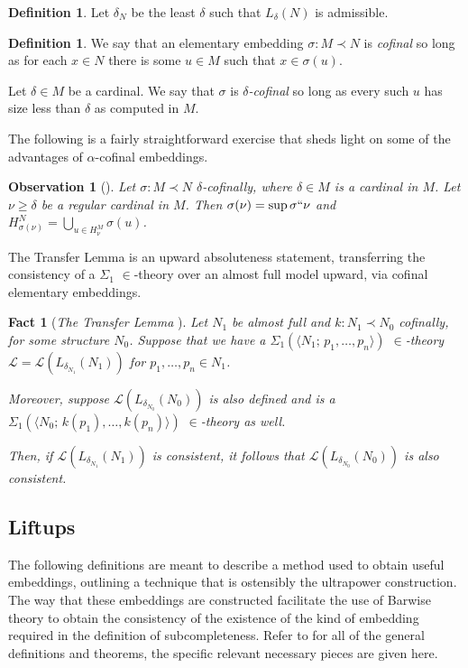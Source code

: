 \documentclass{amsart}
\newtheorem{observation}[theorem]{Observation}
\newtheorem{fact}[theorem]{Fact}
\theoremstyle{definition}
\newtheorem{definition}[theorem]{Definition}
\theoremstyle{remark}
\begin{document}
\begin{definition} Let $\delta_N$ be the least $\delta$ such that $L_\delta(N)$ is admissible. \end{definition}

\begin{definition} We say that an elementary embedding $\sigma: M \prec N$ is \emph{cofinal} so long as for each $x \in N$ there is some $u \in M$ such that $x \in \sigma(u)$. 

Let $\delta \in M$ be a cardinal. We say that $\sigma$ is \emph{$\delta$-cofinal} so long as every such $u$ has size less than $\delta$ as computed in $M$. \end{definition}

The following is a fairly straightforward exercise that sheds light on some of the advantages of $\alpha$-cofinal embeddings.

\begin{observation}[{\cite[Cor. 3.7]{Jensen:2014}}] \label{observation:regularitySups}
Let $\sigma:M \prec N$ $\delta$-cofinally, where $\delta \in M$ is a cardinal in $M$. Let $\nu \geq \delta$ be a regular cardinal in $M$. Then $\sigma(\nu)=\sup \sigma``\nu$ and $H_{\sigma(\nu)}^N=\bigcup_{u \in H_\nu^M}\sigma(u)$.
\end{observation}

The Transfer Lemma is an upward absoluteness statement, transferring the consistency of a $\Sigma_1$ $\in$-theory over an almost full model upward, via cofinal elementary embeddings. 

\begin{fact}[\emph{The Transfer Lemma} {\cite[Lemma 4.5]{Jensen:2014}}]\label{fact:Transfer} Let $N_1$ be almost full and $k: N_1 \prec N_0$ cofinally, for some structure $N_0$. Suppose that we have a $\Sigma_1(\langle N_1; \, p_1, \dots, p_n\rangle)$  $\in$-theory $\mathcal L=\mathcal L(L_{\delta_{N_1}}(N_1))$  for $p_1, \dots, p_n \in N_1$.

Moreover, suppose $\mathcal L(L_{\delta_{N_0}}(N_0))$ is also defined and is a $\Sigma_1(\langle N_0; \, k(p_1), \dots, k(p_n)\rangle)$ $\in$-theory as well. 

Then, 
if $\mathcal L(L_{\delta_{N_1}}(N_1))$ is consistent, it follows that $\mathcal L(L_{\delta_{N_0}}(N_0))$ is also consistent. \end{fact} 

\subsection{Liftups}
\label{subsec:Liftups}
The following definitions are meant to describe a method used to obtain useful embeddings, outlining a technique that is ostensibly the ultrapower construction. The way that these embeddings are constructed facilitate the use of Barwise theory to obtain the consistency of the existence of the kind of embedding required in the definition of subcompleteness. Refer to \cite[Ch.~3]{Jensen:2014} for all of the general definitions and theorems, the specific relevant necessary pieces are given here.
\end{document}
